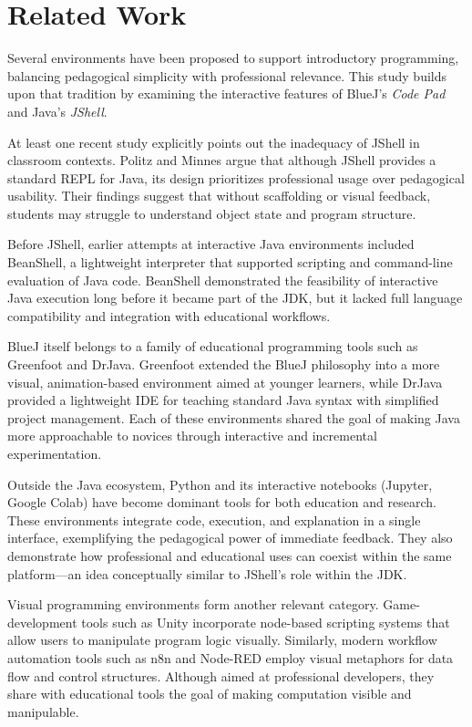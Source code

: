 \documentclass{article}
\begin{document}
\section{Related Work}

Several environments have been proposed to support introductory programming, balancing pedagogical simplicity with professional relevance. This study builds upon that tradition by examining the interactive features of BlueJ’s \textit{Code Pad} and Java’s \textit{JShell}.

At least one recent study explicitly points out the inadequacy of JShell in classroom contexts. Politz and Minnes \cite{politz_minnes2018jshell} argue that although JShell provides a standard REPL for Java, its design prioritizes professional usage over pedagogical usability. Their findings suggest that without scaffolding or visual feedback, students may struggle to understand object state and program structure.

Before JShell, earlier attempts at interactive Java environments included BeanShell, a lightweight interpreter that supported scripting and command-line evaluation of Java code. BeanShell demonstrated the feasibility of interactive Java execution long before it became part of the JDK, but it lacked full language compatibility and integration with educational workflows.

BlueJ itself belongs to a family of educational programming tools such as Greenfoot and DrJava. Greenfoot extended the BlueJ philosophy into a more visual, animation-based environment aimed at younger learners, while DrJava provided a lightweight IDE for teaching standard Java syntax with simplified project management. Each of these environments shared the goal of making Java more approachable to novices through interactive and incremental experimentation.

Outside the Java ecosystem, Python and its interactive notebooks (Jupyter, Google Colab) have become dominant tools for both education and research. These environments integrate code, execution, and explanation in a single interface, exemplifying the pedagogical power of immediate feedback. They also demonstrate how professional and educational uses can coexist within the same platform—an idea conceptually similar to JShell’s role within the JDK.

Visual programming environments form another relevant category. Game-development tools such as Unity incorporate node-based scripting systems that allow users to manipulate program logic visually. Similarly, modern workflow automation tools such as n8n and Node-RED employ visual metaphors for data flow and control structures. Although aimed at professional developers, they share with educational tools the goal of making computation visible and manipulable.
\end{document}
